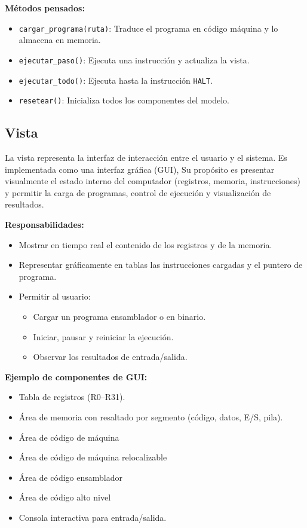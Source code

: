 \documentclass{article}
\begin{document}
\textbf{Métodos pensados:}
\begin{itemize}
  \item \texttt{cargar\_programa(ruta)}: Traduce el programa en código máquina y lo
        almacena en memoria.
  \item \texttt{ejecutar\_paso()}: Ejecuta una instrucción y actualiza la vista.
  \item \texttt{ejecutar\_todo()}: Ejecuta hasta la instrucción \texttt{HALT}.
  \item \texttt{resetear()}: Inicializa todos los componentes del modelo.
\end{itemize}


\subsection{Vista}

La vista representa la interfaz de interacción entre el usuario y el sistema.
Es implementada como una interfaz gráfica (GUI),
Su propósito es presentar visualmente el estado interno
del computador (registros, memoria, instrucciones) y permitir la carga de programas,
control de ejecución y visualización de resultados.

\textbf{Responsabilidades:}
\begin{itemize}
  \item Mostrar en tiempo real el contenido de los registros y de la memoria.
  \item Representar gráficamente en tablas las instrucciones cargadas y el puntero de programa.
  \item Permitir al usuario:
        \begin{itemize}
          \item Cargar un programa ensamblador o en binario.
          \item Iniciar, pausar y reiniciar la ejecución.
          \item Observar los resultados de entrada/salida.
        \end{itemize}
\end{itemize}

\textbf{Ejemplo de componentes de GUI:}
\begin{itemize}
  \item Tabla de registros (R0–R31).
  \item Área de memoria con resaltado por segmento (código, datos, E/S, pila).
  \item Área de código de máquina
  \item Área de código de máquina relocalizable
  \item Área de código ensamblador
  \item Área de código alto nivel
  \item Consola interactiva para entrada/salida.
\end{itemize}
\end{document}
